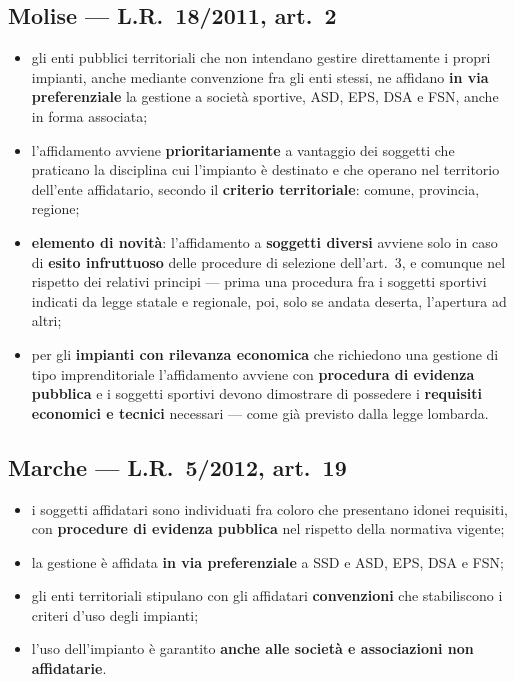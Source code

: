 \subsection{Molise --- L.R.\ 18/2011, art.\ 2}

\begin{itemize}
  \item gli enti pubblici territoriali che non intendano gestire direttamente i propri impianti,
    anche mediante convenzione fra gli enti stessi, ne affidano \textbf{in via preferenziale} la
    gestione a società sportive, ASD, EPS, DSA e FSN, anche in forma associata;
  \item l'affidamento avviene \textbf{prioritariamente} a vantaggio dei soggetti che praticano la
    disciplina cui l'impianto è destinato e che operano nel territorio dell'ente affidatario,
    secondo il \textbf{criterio territoriale}: comune, provincia, regione;
  \item \textbf{elemento di novità}: l'affidamento a \textbf{soggetti diversi} avviene solo in caso
    di \textbf{esito infruttuoso} delle procedure di selezione dell'art.\ 3, e comunque nel
    rispetto dei relativi principi --- prima una procedura fra i soggetti sportivi indicati da
    legge statale e regionale, poi, solo se andata deserta, l'apertura ad altri;
  \item per gli \textbf{impianti con rilevanza economica} che richiedono una gestione di tipo
    imprenditoriale l'affidamento avviene con \textbf{procedura di evidenza pubblica} e i soggetti
    sportivi devono dimostrare di possedere i \textbf{requisiti economici e tecnici} necessari ---
    come già previsto dalla legge lombarda.
\end{itemize}

\subsection{Marche --- L.R.\ 5/2012, art.\ 19}

\begin{itemize}
  \item i soggetti affidatari sono individuati fra coloro che presentano idonei requisiti, con
    \textbf{procedure di evidenza pubblica} nel rispetto della normativa vigente;
  \item la gestione è affidata \textbf{in via preferenziale} a SSD e ASD, EPS, DSA e FSN;
  \item gli enti territoriali stipulano con gli affidatari \textbf{convenzioni} che stabiliscono i
    criteri d'uso degli impianti;
  \item l'uso dell'impianto è garantito \textbf{anche alle società e associazioni non
    affidatarie}.
\end{itemize}

